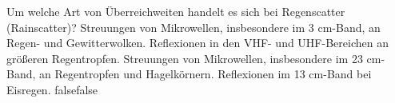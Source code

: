     {Um welche Art von Überreichweiten handelt es sich bei Regenscatter (Rainscatter)?}
    {Streuungen von Mikrowellen, insbesondere im 3 cm-Band, an Regen- und Gewitterwolken.}
    {Reflexionen in den VHF- und UHF-Bereichen an größeren Regentropfen.}
    {Streuungen von Mikrowellen, insbesondere im 23 cm-Band, an Regentropfen und Hagelkörnern.}
    {Reflexionen im 13 cm-Band bei Eisregen.}
    {false}{false}